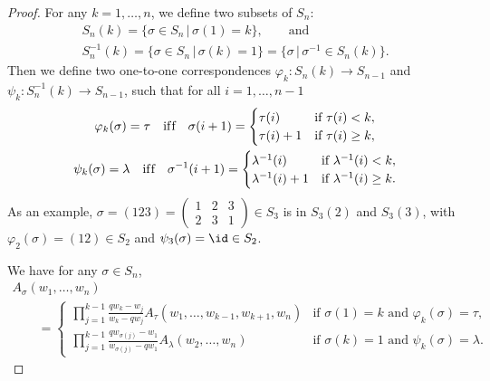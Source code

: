 \begin{proof}
 For any $k = 1, \dotsc, n$, we def\/ine two subsets of $S_n$:
 \begin{gather}
 S_n(k) = \{ \sigma \in S_n \,|\, \sigma(1) = k \}, \qquad \text{and} \nonumber\\
  S^{-1}_n(k) = \{ \sigma \in S_n \,|\, \sigma(k) = 1 \} = \big\{ \sigma \,|\, \sigma^{-1} \in S_n(k) \big\}.\label{eq:defn_S_n(k)}
 \end{gather}
 Then we def\/ine two one-to-one correspondences $\varphi_k\colon S_n(k) \to S_{n - 1}$ and $\psi_k\colon S^{-1}_n(k) \to S_{n - 1}$, such that
for all $i = 1, \dotsc, n - 1$
 \begin{gather}
 \varphi_k(\sigma) =   \tau \quad \text{if\/f} \quad \sigma(i + 1) =
 \begin{cases}
 \tau(i) & \text{if $\tau(i) < k$}, \\
 \tau(i) + 1 & \text{if $\tau(i) \geq k$},
 \end{cases} \nonumber\\
 \psi_k(\sigma) =   \lambda \quad \text{if\/f} \quad \sigma^{-1}(i + 1) =
 \begin{cases}
 \lambda^{-1}(i) & \text{if $\lambda^{-1}(i) < k$}, \\
 \lambda^{-1}(i) + 1 & \text{if $\lambda^{-1}(i) \geq k$}.
 \end{cases}
\label{eq:defn_varphi_k_and_psi_k}
 \end{gather}
 As an example, $\sigma = (123) = \left(
 \begin{smallmatrix}
 1 & 2 & 3 \\
 2 & 3 & 1
 \end{smallmatrix}
 \right) \in S_3$ is in $S_3(2)$ and $S_3(3)$, with $\varphi_2(\sigma) = (12) \in S_2$ and $\psi_3(\sigma) = \id \in S_2$.


 We have for any $\sigma \in S_n$,
\begin{gather}
 A_{\sigma}(w_1, \dotsc, w_n) \nonumber\\
\qquad{} =
 \begin{cases}
 \displaystyle \prod^{k - 1}_{j = 1} \frac{q w_k - w_j}{w_k - q w_j} A_{\tau}(w_1, \dotsc, w_{ k - 1}, w_{k + 1}, w_n) & \text{if $\sigma(1) = k$ and $\varphi_k(\sigma) = \tau$}, \\
 \displaystyle \prod^{k - 1}_{j = 1} \frac{q w_{\sigma(j)} - w_1}{w_{\sigma(j)} - q w_1} A_{\lambda}(w_2, \dotsc, w_n) & \text{if $\sigma(k) = 1$ and $\psi_k(\sigma) = \lambda$}.
 \end{cases}\label{eq:A_sigma_in_A_tau_A_lambda}
 \end{gather}


\end{proof}
